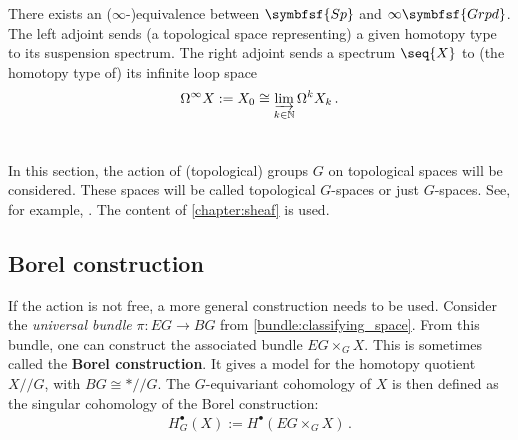     \begin{property}
        There exists an ($\infty$-)equivalence between $\symbfsf{Sp}$ and $\infty\symbfsf{Grpd}$. The left adjoint sends (a topological space representing) a given homotopy type to its suspension spectrum. The right adjoint sends a spectrum $\seq{X}$ to (the homotopy type of) its infinite loop space
        \begin{gather}
            \Omega^\infty X:=X_0\cong\varinjlim_{k\in\mathbb{N}}\Omega^kX_k\,.
        \end{gather}
    \end{property}

\section{}

    In this section, the action of (topological) groups $G$ on topological spaces will be considered. These spaces will be called topological $G$-spaces or just $G$-spaces. See, for example, \citet{cartier_mad_2001,rozenblyum_bung_2023}. The content of \cref{chapter:sheaf} is used.

\subsection{Borel construction}


    If the action is not free, a more general construction needs to be used. Consider the \textit{universal bundle} $\pi:EG\rightarrow BG$ from \cref{bundle:classifying_space}. From this bundle, one can construct the associated bundle $EG\times_G X$. This is sometimes called the \textbf{Borel construction}. It gives a model for the homotopy quotient $X/\!\!/G$, with $BG\cong\ast/\!\!/G$. The $G$-equivariant cohomology of $X$ is then defined as the singular cohomology of the Borel construction:
    \begin{gather}
        H_G^\bullet(X) := H^\bullet(EG\times_GX)\,.
    \end{gather}

